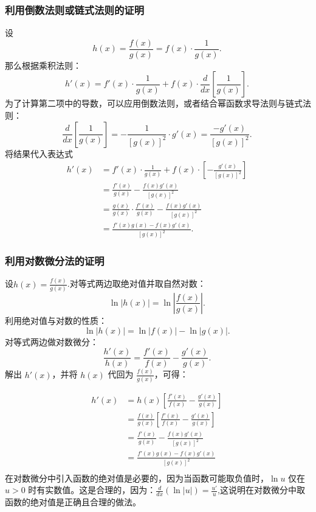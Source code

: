 \subsubsection{利用倒数法则或链式法则的证明}
设
$$
h(x) = \frac{f(x)}{g(x)} = f(x) \cdot \frac{1}{g(x)}.~
$$
那么根据乘积法则：
$$
h'(x) = f'(x)\cdot \frac{1}{g(x)} + f(x)\cdot \frac{d}{dx}\left[\frac{1}{g(x)}\right].~
$$
为了计算第二项中的导数，可以应用倒数法则，或者结合幂函数求导法则与链式法则：
$$
\frac{d}{dx}\left[\frac{1}{g(x)}\right] = -\frac{1}{[g(x)]^2}\cdot g'(x) = \frac{-g'(x)}{[g(x)]^2}.~
$$
将结果代入表达式
$$
\begin{aligned}
h'(x) &= f'(x)\cdot \frac{1}{g(x)} + f(x)\cdot \left[-\frac{g'(x)}{[g(x)]^2}\right]\\
&= \frac{f'(x)}{g(x)} - \frac{f(x)g'(x)}{[g(x)]^2}\\
&= \frac{g(x)}{g(x)} \cdot \frac{f'(x)}{g(x)} - \frac{f(x)g'(x)}{[g(x)]^2}\\
&= \frac{f'(x)g(x) - f(x)g'(x)}{[g(x)]^2}.
\end{aligned}~
$$
\subsubsection{利用对数微分法的证明}
设$h(x) = \frac{f(x)}{g(x)}$.对等式两边取绝对值并取自然对数：
$$
\ln |h(x)| = \ln \left|\frac{f(x)}{g(x)}\right|.~
$$
利用绝对值与对数的性质：
$$
\ln |h(x)| = \ln |f(x)| - \ln |g(x)|.~
$$
对等式两边做对数微分：
$$
\frac{h'(x)}{h(x)} = \frac{f'(x)}{f(x)} - \frac{g'(x)}{g(x)}.~
$$
解出 $h'(x)$，并将 $h(x)$ 代回为 $\tfrac{f(x)}{g(x)}$，可得：

$$
\begin{aligned}
h'(x) &= h(x)\left[\frac{f'(x)}{f(x)} - \frac{g'(x)}{g(x)}\right]\\
&= \frac{f(x)}{g(x)}\left[\frac{f'(x)}{f(x)} - \frac{g'(x)}{g(x)}\right]\\
&= \frac{f'(x)}{g(x)} - \frac{f(x)g'(x)}{[g(x)]^2}\\
&= \frac{f'(x)g(x) - f(x)g'(x)}{[g(x)]^2}\\
\end{aligned}~
$$
在对数微分中引入函数的绝对值是必要的，因为当函数可能取负值时，$\ln u$ 仅在 $u>0$ 时有实数值。这是合理的，因为：$\frac{d}{dx}(\ln |u|) = \frac{u'}{u}$,这说明在对数微分中取函数的绝对值是正确且合理的做法。
